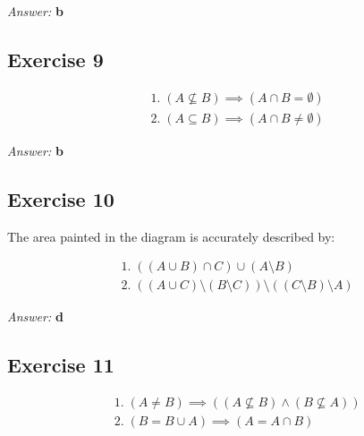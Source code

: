 \documentclass[11pt]{article}
\begin{document}
\emph{Answer:} \textbf{b}
\subsection{Exercise 9}
\label{sec-2-9}
\begin{equation}
\begin{split}
& 1.\; (A \not \subseteq B) \implies (A \cap B = \emptyset) \\
& 2.\; (A \subseteq B) \implies (A \cap B \neq \emptyset)
\end{split}
\end{equation}

\emph{Answer:} \textbf{b}
\subsection{Exercise 10}
\label{sec-2-10}


The area painted in the diagram is accurately described by:

\begin{equation}
\begin{split}
& 1.\; ((A \cup B) \cap C) \cup (A \setminus B) \\
& 2.\; ((A \cup C) \setminus (B \setminus C)) \setminus ((C \setminus B) \setminus A)
\end{split}
\end{equation}

\emph{Answer:} \textbf{d}

\subsection{Exercise 11}
\label{sec-2-11}
\begin{equation}
\begin{split}
& 1.\; (A \neq B) \implies ((A \not \subseteq B) \land (B \not \subseteq A)) \\
& 2.\; (B = B \cup A) \implies (A = A \cap B)
\end{split}
\end{equation}
\end{document}

